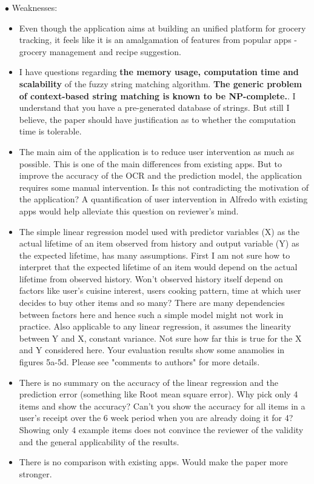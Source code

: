 \documentclass[a4paper, 12pt]{article}
\begin{document}
\begin{center}
\noindent$\bullet$ Weaknesses:
\begin{itemize}
\item Even though the application aims at building an unified platform for grocery tracking, it feels like it is an amalgamation of features from popular apps - grocery management and recipe suggestion. 
\item I have questions regarding {\bf the memory usage, computation time and scalability} of the fuzzy string matching algorithm. {\bf The generic problem of context-based string matching is known to be NP-complete.}. I understand that you have a pre-generated database of strings. But still I believe, the paper should have justification as to whether the computation time is tolerable. 
\item The main aim of the application is to reduce user intervention as much as possible. This is one of the main differences from existing apps. But to improve the accuracy of the OCR and the prediction model, the application requires some manual intervention. Is this not contradicting the motivation of the application? A quantification of user intervention in Alfredo with existing apps would help alleviate this question on reviewer's mind.
\item The simple linear regression model used with predictor variables (X) as the actual lifetime of an item observed from history and output variable (Y) as the expected lifetime, has many assumptions. First I am not sure how to interpret that the expected lifetime of an item would depend on the actual lifetime from observed history. Won't observed history itself depend on factors like user's cuisine interest, users cooking pattern, time at which user decides to buy other items and so many? There are many dependencies between factors here and hence such a simple model might not work in practice. Also applicable to any linear regression, it assumes the linearity between Y and X, constant variance. Not sure how far this is true for the X and Y considered here. Your evaluation results show some anamolies in figures 5a-5d. Please see "comments to authors" for more details.
\item There is no summary on the accuracy of the linear regression and the prediction error (something like Root mean square error). Why pick only 4 items and show the accuracy? Can't you show the accuracy for all items in a user's receipt over the 6 week period when you are already doing it for 4? Showing only 4 example items does not convince the reviewer of the validity and the general applicability of the results.
\item There is no comparison with existing apps. Would make the paper more stronger.  
\end{itemize}


\end{center}
\end{document}
